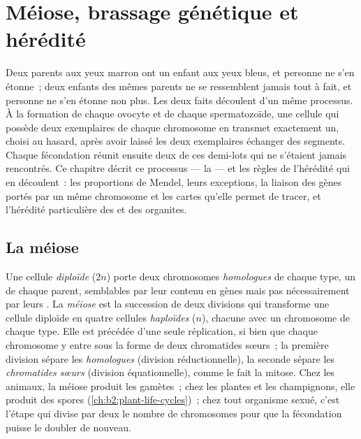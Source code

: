 \chapter{Méiose, brassage génétique et hérédité}\label{ch:b2:meiosis-heredity}

Deux parents aux yeux marron ont un enfant aux yeux bleus, et personne
ne s'en étonne~; deux enfants des mêmes parents ne se ressemblent jamais
tout à fait, et personne ne s'en étonne non plus. Les deux faits
découlent d'un même processus. À la formation de chaque ovocyte et de
chaque spermatozoïde, une cellule qui possède deux exemplaires de chaque
chromosome en transmet exactement un, choisi au hasard, après avoir
laissé les deux exemplaires échanger des segments. Chaque fécondation
réunit ensuite deux de ces demi-lots qui ne s'étaient jamais rencontrés.
Ce chapitre décrit ce processus --- la  --- et les règles de
l'hérédité qui en découlent~: les proportions de Mendel, leurs
exceptions, la liaison des gènes portés par un même chromosome et les
cartes qu'elle permet de tracer, et l'hérédité particulière des
 et des organites.

\section{La méiose}

\begin{definition}[Méiose]\label{def:b2:meiosis-heredity:meiosis}
Une cellule \emph{diploïde} ($2n$) porte deux chromosomes
\emph{homologues} de chaque type, un de chaque parent, semblables par
leur contenu en gènes mais pas nécessairement par leurs . La
\emph{méiose} est la succession de deux divisions qui transforme une
cellule diploïde en quatre cellules \emph{haploïdes} ($n$), chacune avec
un chromosome de chaque type. Elle est précédée d'une seule
réplication, si bien que chaque chromosome y entre sous la forme de
deux chromatides sœurs~; la première division sépare les
\emph{homologues} (division réductionnelle), la seconde sépare les
\emph{chromatides sœurs} (division équationnelle), comme le fait la
mitose. Chez les animaux, la méiose produit les gamètes~; chez les
plantes et les champignons, elle produit des spores
(\cref{ch:b2:plant-life-cycles})~; chez tout organisme sexué, c'est
l'étape qui divise par deux le nombre de chromosomes pour que la
fécondation puisse le doubler de nouveau.
\end{definition}

